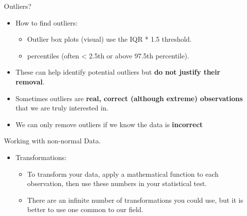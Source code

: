\documentclass[
  ignorenonframetext,
]{beamer}
\providecommand{\tightlist}{%
  \setlength{\itemsep}{0pt}\setlength{\parskip}{0pt}}
\begin{document}
\begin{frame}{Outliers?}
\label{outliers}
\begin{itemize}
\item
  How to find outliers:

  \begin{itemize}
  \tightlist
  \item
    Outlier box plots (visual) use the IQR * 1.5 threshold.
  \item
    percentiles (often \textless{} 2.5th or above 97.5th percentile).
  \end{itemize}
\item
  These can help identify potential outliers but \textbf{do not justify
  their removal}.
\item
  Sometimes outliers are \textbf{real, correct (although extreme)
  observations} that we are truly interested in.
\item
  We can only remove outliers if we know the data is \textbf{incorrect}
\end{itemize}
\end{frame}

\begin{frame}{Working with non-normal Data.}
\label{working-with-non-normal-data.}
\begin{itemize}
\tightlist
\item
  Transformations:

  \begin{itemize}
  \tightlist
  \item
    To transform your data, apply a mathematical function to each
    observation, then use these numbers in your statistical test.
  \item
    There are an infinite number of transformations you could use, but
    it is better to use one common to our field.
  \end{itemize}
\end{itemize}
\end{frame}
\end{document}
